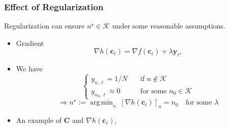 \documentclass[10pt,xcolor={usenames,dvipsnames,table}]{beamer}
\DeclareMathOperator*{\argmin}{arg\,min}
\newcommand\mymatrixbraceoffseth{0.5em}
\newcommand*\mymatrixbraceright[4][m]{
    \draw[mymatrixbrace] ($(#1.north west)!(#1-#3-1.south west)!(#1.south west)-(\mymatrixbraceoffseth,0)$)
        -- node[left=2pt] {#4} 
        ($(#1.north west)!(#1-#2-1.north west)!(#1.south west)-(\mymatrixbraceoffseth,0)$);
}
\begin{document}
\begin{frame}[label=current]
    \frametitle{Effect of Regularization}
    \begin{block}

        Regularization can ensure $n^{\star} \in \mathcal{K}$ under some reasonable assumptions.
    \end{block}
    \begin{itemize}
        \item Gradient 
\begin{equation*} 
    \nabla h(\bm{c}_\ell) = \nabla f(\bm{c}_\ell) + \lambda \bm{y}_\ell, 
\end{equation*}
    \item We have 
        \[
            \begin{cases}
                y_{n, \ell} = 1/N \quad & \text{if } n \notin \mathcal{K} \\
                y_{n_0, \ell} \approx 0 \quad& \text{for some }  n_0 \in \mathcal{K}
            \end{cases}
        \] 
        \[
            \Rightarrow n^{\star}:=\argmin_{n} \; [\nabla h(\bm{c}_\ell)]_n = n_0 \quad \text{for some $\lambda$}
        \] 
\item An example of $\bm{C}$ and $\nabla h(\bm{c}_\ell)$,
%

\end{itemize}
\end{frame}
\end{document}
